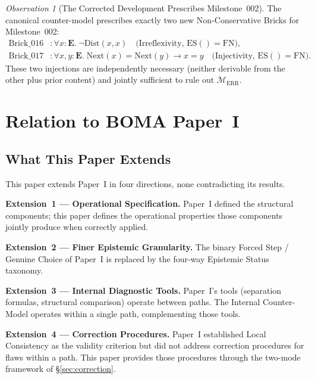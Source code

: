 \documentclass[12pt, a4paper]{article}
\theoremstyle{plain}
\theoremstyle{definition}
\theoremstyle{remark}
\newtheorem{observation}[theorem]{Observation}
\newcommand{\BOMA}{\textsf{BOMA}}
\newcommand{\ES}[1]{\mathrm{ES}(#1)}
\newcommand{\FN}{\mathrm{FN}}
\begin{document}
\begin{observation}[The Corrected Development Prescribes Milestone~002]
The canonical counter-model prescribes exactly two new Non-Conservative
Bricks for Milestone~002:
\begin{align*}
  \text{Brick\_016} &:
    \forall x : \mathbf{E}.\;\neg\mathrm{Dist}(x,x)
    \quad \text{(Irreflexivity, } \ES{} = \FN\text{)}, \\
  \text{Brick\_017} &:
    \forall x,y : \mathbf{E}.\;
    \mathrm{Next}(x) = \mathrm{Next}(y) \to x = y
    \quad \text{(Injectivity, } \ES{} = \FN\text{)}.
\end{align*}
These two injections are independently necessary (neither derivable
from the other plus prior content) and jointly sufficient to rule out
$\mathcal{M}_{\mathrm{ERR}}$.
\end{observation}

\section{Relation to \BOMA{} Paper~I}
\label{sec:paper1}

\subsection{What This Paper Extends}
\label{subsec:rel-extends}

This paper extends Paper~I in four directions, none contradicting its
results.

\textbf{Extension~1 --- Operational Specification.}
Paper~I defined the structural components; this paper defines the
operational properties those components jointly produce when correctly
applied.

\textbf{Extension~2 --- Finer Epistemic Granularity.}
The binary Forced Step / Genuine Choice of Paper~I is replaced by the
four-way Epistemic Status taxonomy.

\textbf{Extension~3 --- Internal Diagnostic Tools.}
Paper~I's tools (separation formulas, structural comparison) operate
between paths. The Internal Counter-Model operates within a single
path, complementing those tools.

\textbf{Extension~4 --- Correction Procedures.}
Paper~I established Local Consistency as the validity criterion but
did not address correction procedures for flaws within a path. This
paper provides those procedures through the two-mode framework of
\S\ref{sec:correction}.
\end{document}
